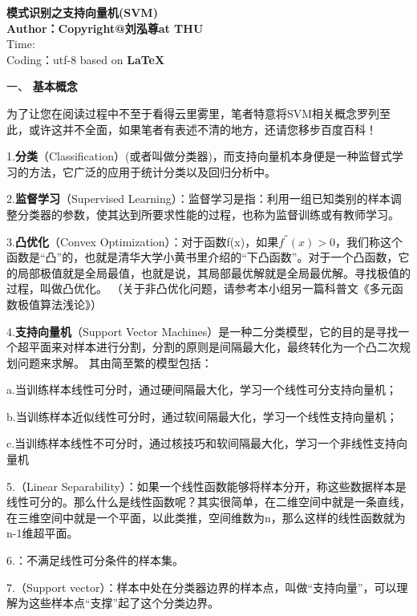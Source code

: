 \documentclass[UTF8]{article}
\begin{document}
{\songti
	\begin{center}{\heiti\textbf{模式识别\quad 之\quad 支持向量机}\textbf{(SVM)}\\
		\textbf{	Author：\quad Copyright@刘泓尊\quad at THU} \\
			Time: \\
			Coding：utf-8 based on \textbf{\LaTeX}}
	\end{center}

一、	{\heiti\textbf{基本概念}}

为了让您在阅读过程中不至于看得云里雾里，笔者特意将SVM相关概念罗列至此，或许这并不全面，如果笔者有表述不清的地方，还请您移步百度百科！

1.{\heiti\textbf{分类}}（Classification）(或者叫做分类器)，而支持向量机本身便是一种监督式学习的方法，它广泛的应用于统计分类以及回归分析中。

2.{\heiti\textbf{监督学习}}（Supervised Learning）：监督学习是指：利用一组已知类别的样本调整分类器的参数，使其达到所要求性能的过程，也称为监督训练或有教师学习。

3.{\heiti\textbf{凸优化}}（Convex Optimization）：对于函数f(x)，如果$f^{''}(x)>0$，我们称这个函数是“凸”的，也就是清华大学小黄书里介绍的“下凸函数”。对于一个凸函数，它的局部极值就是全局最值，也就是说，其局部最优解就是全局最优解。寻找极值的过程，叫做凸优化。
（关于非凸优化问题，请参考本小组另一篇科普文《多元函数极值算法浅论》）

4.{\heiti\textbf{支持向量机}}（Support Vector Machines）是一种二分类模型，它的目的是寻找一个超平面来对样本进行分割，分割的原则是间隔最大化，最终转化为一个凸二次规划问题来求解。
其由简至繁的模型包括：
\par{a.当训练样本线性可分时，通过硬间隔最大化，学习一个线性可分支持向量机；}
\par{b.当训练样本近似线性可分时，通过软间隔最大化，学习一个线性支持向量机；}
\par{c.当训练样本线性不可分时，通过核技巧和软间隔最大化，学习一个非线性支持向量机}

5.{}（Linear Separability）：如果一个线性函数能够将样本分开，称这些数据样本是线性可分的。那么什么是线性函数呢？其实很简单，在二维空间中就是一条直线，在三维空间中就是一个平面，以此类推，空间维数为n，那么这样的线性函数就为n-1维超平面。

6.{}：不满足线性可分条件的样本集。

7.{}（Support vector）：样本中处在分类器边界的样本点，叫做“支持向量”，可以理解为这些样本点“支撑”起了这个分类边界。\\

}
\end{document}
